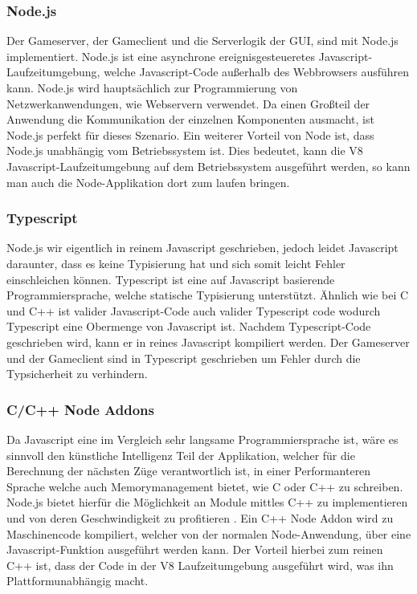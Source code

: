 \documentclass[12pt,a4paper,bibliography=totocnumbered,listof=totocnumbered]{article}
\begin{document}
\subsubsection{Node.js}
Der Gameserver, der Gameclient und die Serverlogik der GUI, sind mit Node.js implementiert. 
Node.js ist eine asynchrone ereignisgesteueretes Javascript-Laufzeitumgebung, welche Javascript-Code außerhalb des Webbrowsers ausführen kann.
Node.js wird hauptsächlich zur Programmierung von Netzwerkanwendungen, wie Webservern verwendet. Da einen Großteil der Anwendung die
Kommunikation der einzelnen Komponenten ausmacht, ist Node.js perfekt für dieses Szenario. 
Ein weiterer Vorteil von Node ist, dass Node.js unabhängig vom Betriebssystem ist. Dies bedeutet, kann die V8 Javascript-Laufzeitumgebung
auf dem Betriebssystem ausgeführt werden, so kann man auch die Node-Applikation dort zum laufen bringen.
\cite{Node}

\subsubsection{Typescript}
Node.js wir eigentlich in reinem Javascript geschrieben, jedoch leidet Javascript daraunter, dass es keine Typisierung hat und sich somit leicht Fehler 
einschleichen können. Typescript ist eine auf Javascript basierende Programmiersprache, welche statische Typisierung unterstützt. 
Ähnlich wie bei C und C++ ist valider Javascript-Code auch valider Typescript code wodurch Typescript eine Obermenge von Javascript ist.
Nachdem Typescript-Code geschrieben wird, kann er in reines Javascript kompiliert werden. 
Der Gameserver und der Gameclient sind in Typescript geschrieben um Fehler durch die Typsicherheit zu verhindern. 

\subsubsection{C/C++ Node Addons}
Da Javascript eine im Vergleich sehr langsame Programmiersprache ist, wäre es sinnvoll den künstliche Intelligenz Teil der Applikation, welcher für die 
Berechnung der nächsten Züge verantwortlich ist, in einer Performanteren Sprache welche auch Memorymanagement bietet, wie C oder C++ zu schreiben. 
Node.js bietet hierfür die Möglichkeit an
Module mittles C++ zu implementieren und von deren Geschwindigkeit zu profitieren \cite{NodeC++Performance}. Ein C++ Node Addon wird zu Maschinencode kompiliert, welcher von der
normalen Node-Anwendung, über eine Javascript-Funktion ausgeführt werden kann. Der Vorteil hierbei zum reinen C++ ist, dass der Code in der V8 
Laufzeitumgebung ausgeführt wird, was ihn Plattformunabhängig macht. \cite{C++Node}
\end{document}
